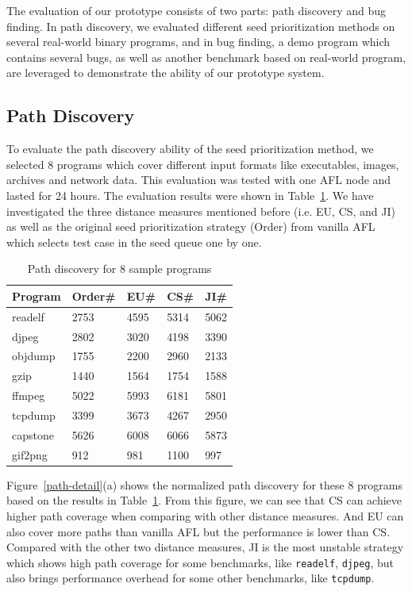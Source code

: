 The evaluation of our prototype consists of two parts: path discovery and bug finding. In path discovery, we evaluated different seed prioritization methods on several real-world binary programs, and in bug finding, a demo program which contains several bugs, as well as another benchmark based on real-world program, are leveraged to demonstrate the ability of our prototype system.

\subsection{Path Discovery}
To evaluate the path discovery ability of the seed prioritization method, we selected 8 programs which cover different input formats like executables, images, archives and network data. This evaluation was tested with one AFL node and lasted for 24 hours. The evaluation results were shown in Table~\ref{PD-8samples}. We have investigated the three distance measures mentioned before (i.e. EU, CS, and JI) as well as the original seed prioritization strategy (Order) from vanilla AFL which selects test case in the seed queue one by one.  

\begin{table}
  \caption{\label{PD-8samples}Path discovery for 8 sample programs}
  \centering
	\begin{tabular}{p{2cm}<{\centering} p{1.5cm}<{\centering} p{1.5cm}<{\centering} p{1.5cm}<{\centering} p{1.5cm}<{\centering}}
		\toprule
		Program  & Order\# & EU\# & CS\# & JI\# \\ 
		\midrule
		readelf  &    2753 & 4595 & 5314 & 5062 \\
		 djpeg   &    2802 & 3020 & 4198 & 3390 \\
		objdump  &    1755 & 2200 & 2960 & 2133 \\
		  gzip   &    1440 & 1564 & 1754 & 1588 \\
		 ffmpeg  &    5022 & 5993 & 6181 & 5801 \\
		tcpdump  &    3399 & 3673 & 4267 & 2950 \\
		capstone &    5626 & 6008 & 6066 & 5873 \\
		gif2png  &     912 &  981 & 1100 &  997 \\ 
		\bottomrule
	\end{tabular}
\end{table}

Figure~\ref{path-detail}(a) shows the normalized path discovery for these 8 programs based on the results in Table~\ref{PD-8samples}. From this figure, we can see that CS can achieve higher path coverage when comparing with other distance measures. And EU can also cover more paths than vanilla AFL but the performance is lower than CS. Compared with the other two distance measures, JI is the most unstable strategy which shows high path coverage for some benchmarks, like \texttt{readelf}, \texttt{djpeg}, but also brings performance overhead for some other benchmarks, like \texttt{tcpdump}.


